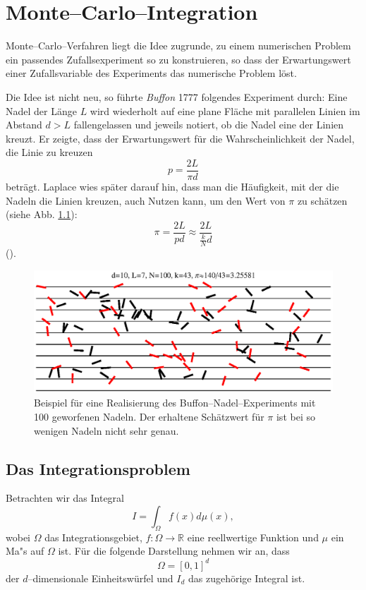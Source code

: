 	\chapter{Monte--Carlo--Integration}\label{chapter:mc_integration}
	Monte--Carlo--Verfahren liegt die Idee zugrunde, zu einem numerischen Problem ein passendes Zufallsexperiment so zu konstruieren, so dass der Erwartungswert einer Zufallsvariable des Experiments das numerische Problem löst.
	
	Die Idee ist nicht neu, so führte {\em Buffon} 1777 folgendes Experiment durch: Eine Nadel der Länge $L$ wird wiederholt auf eine plane Fläche mit parallelen Linien im Abstand $d>L$ fallengelassen und jeweils notiert, ob die Nadel eine der Linien kreuzt. Er zeigte, dass der Erwartungswert für die Wahrscheinlichkeit der Nadel, die Linie zu kreuzen $$p=\frac{2L}{\pi d}$$ beträgt. Laplace wies später darauf hin, dass  man die Häufigkeit, mit der die Nadeln die Linien kreuzen, auch Nutzen kann, um den Wert von $\pi$ zu schätzen (siehe Abb. \ref{fig:buffon}): $$\pi=\frac{2L}{p d}\approx \frac{2L}{\frac{k}{N}d}$$
	().
	\begin{figure}
		\centering
		\includegraphics[height=0.3\textheight]{buffonsneedles.eps}
		\caption{Beispiel für eine Realisierung des Buffon--Nadel--Experiments mit 100 geworfenen Nadeln. Der erhaltene Schätzwert für $\pi$ ist bei so wenigen Nadeln nicht sehr genau.}
		\label{fig:buffon}
	\end{figure}
	
	\section{Das Integrationsproblem}\label{subsec:integrationsproblem}
	Betrachten wir das Integral
	\begin{equation}
		I=\int_\Omega f(x) d\mu(x),
		\label{eq:integration_problem}
	\end{equation}
	wobei $\Omega$ das Integrationsgebiet, $f : \Omega \to \mathbb{R}$ eine reellwertige Funktion und $\mu$ ein Ma"s auf $\Omega$ ist. Für die folgende Darstellung nehmen wir an, dass $$\Omega=[0,1]^d$$ der $d$--dimensionale Einheitswürfel und $I_d$ das zugehörige Integral ist.
